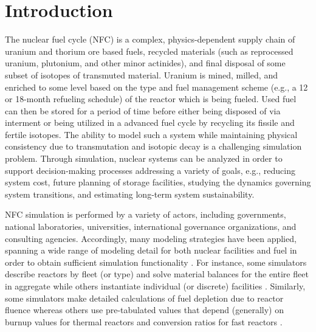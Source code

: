 \section{Introduction}

The nuclear fuel cycle (NFC) is a complex, physics-dependent supply chain of
uranium and thorium ore based fuels, recycled materials (such as reprocessed
uranium, plutonium, and other minor actinides), and final disposal of some
subset of isotopes of transmuted material. Uranium is mined, milled, and
enriched to some level based on the type and fuel management scheme (e.g., a 12
or 18-month refueling schedule) of the reactor which is being fueled. Used fuel
can then be stored for a period of time before either being disposed of via
interment or being utilized in a advanced fuel cycle by recycling its fissile
and fertile isotopes. The ability to model such a system while maintaining
physical consistency due to transmutation and isotopic decay is a challenging
simulation problem. Through simulation, nuclear systems can be analyzed in order
to support decision-making processes addressing a variety of goals, e.g.,
reducing system cost, future planning of storage facilities, studying the
dynamics governing system transitions, and estimating long-term system
sustainability.

NFC simulation is performed by a variety of actors, including governments,
national laboratories, universities, international governance organizations, and
consulting agencies. Accordingly, many modeling strategies have been applied,
spanning a wide range of modeling detail for both nuclear facilities and fuel in
order to obtain sufficient simulation functionality
\cite{brown2016identification}. For instance, some simulators describe reactors
by fleet (or type) and solve material balances for the entire fleet in aggregate
\cite{busquim_e_silva_system_2008, durpel_daness_2003, yacout_vision_2006,
  worrall_scenario_2007} while others instantiate individual (or discrete)
facilities \cite{schneider_nfcsim:_2005}. Similarly, some simulators make
detailed calculations of fuel depletion due to reactor fluence
\cite{boucher_cosi:_2006, mouginot2012class} whereas others use pre-tabulated
values that depend (generally) on burnup values for thermal reactors and
conversion ratios for fast reactors \cite{yacout_vision_2006}.


